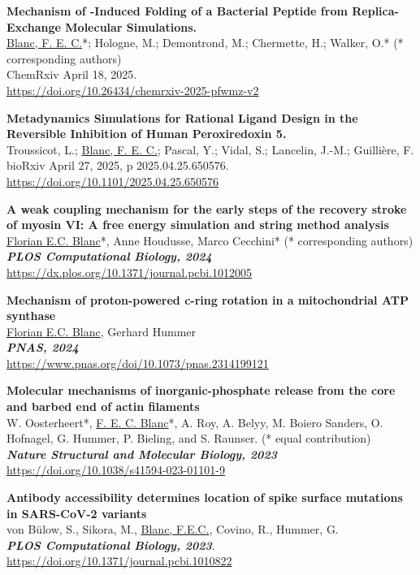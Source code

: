 \newpage
{}
\singlespace

\small

\textbf{Mechanism of -Induced Folding of a Bacterial Peptide from Replica-Exchange Molecular Simulations.}\\
\underline{Blanc, F. E. C.}*; Hologne, M.; Demontrond, M.; Chermette, H.; Walker, O.* (* corresponding authors)\\
ChemRxiv April 18, 2025. \\
\url{https://doi.org/10.26434/chemrxiv-2025-pfwmz-v2}
\vskip 0.1cm

\textbf{Metadynamics Simulations for Rational Ligand Design in the Reversible Inhibition of Human Peroxiredoxin 5.}\\
Troussicot, L.; \underline{Blanc, F. E. C.}; Pascal, Y.; Vidal, S.; Lancelin, J.-M.; Guillière, F.\\
bioRxiv April 27, 2025, p 2025.04.25.650576. \\
\url{https://doi.org/10.1101/2025.04.25.650576}
\vskip 0.1cm

\textbf{A weak coupling mechanism for the early steps of the recovery stroke of myosin VI: A free energy simulation and string method analysis}\\
\underline{Florian E.C. Blanc}*, Anne Houdusse, Marco Cecchini* (* corresponding authors)\\
\textbf{\textit{PLOS Computational Biology, 2024}}\\
\url{https://dx.plos.org/10.1371/journal.pcbi.1012005}
\vskip 0.1cm

\textbf{Mechanism of proton-powered c-ring rotation in a mitochondrial ATP synthase}\\
\underline{Florian E.C. Blanc}, Gerhard Hummer\\
\textbf{\textit{PNAS, 2024}}\\
\url{https://www.pnas.org/doi/10.1073/pnas.2314199121}

\textbf{Molecular mechanisms of inorganic-phosphate release from the core and barbed end of actin filaments}\\
W. Oosterheert*, \underline{F. E. C. Blanc}*, A. Roy, A. Belyy, M. Boiero Sanders, O. Hofnagel, G. Hummer, P. Bieling, and S. Raunser. (* equal contribution)\\
\textbf{\textit{Nature Structural and Molecular Biology, 2023}}\\
\url{https://doi.org/10.1038/s41594-023-01101-9}

\textbf{Antibody accessibility determines location of spike surface mutations in SARS-CoV-2 variants}\\
von Bülow, S., Sikora, M., \underline{Blanc, F.E.C.}, Covino, R., Hummer, G.\\
\textbf{\textit{PLOS Computational Biology, 2023}}.\\
\url{https://doi.org/10.1371/journal.pcbi.1010822}
\vskip 0.1cm

